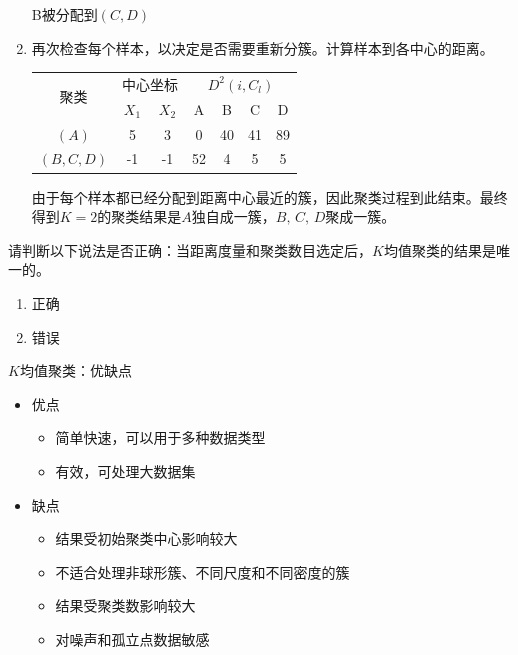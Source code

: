 \begin{example}
\begin{enumerate}
        B被分配到$(C,D)$
        \item 再次检查每个样本，以决定是否需要重新分簇。计算样本到各中心的距离。
        \begin{table}[htbp]
            \centering
            \begin{tabular}{|c|c|c|c|c|c|c|}
            \hline
            \multirow{2}[4]{*}{聚类} & \multicolumn{2}{c|}{中心坐标} & \multicolumn{4}{c|}{$D^2(i,C_l)$} \bigstrut\\
        \cline{2-7}        & $X_1$ & $X_2$ & A   & B   & C   & D \bigstrut\\
            \hline
            $(A)$ & 5   & 3   & 0   & 40  & 41  & 89 \bigstrut\\
            \hline
            $(B,C,D)$ & -1  & -1  & 52  & 4   & 5   & 5 \bigstrut\\
            \hline
            \end{tabular}%
        \end{table}%
        
        由于每个样本都已经分配到距离中心最近的簇，因此聚类过程到此结束。最终得到$K=2 $的聚类结果是$A $独自成一簇，$B,\,C,\,D $聚成一簇。
    \end{enumerate}
\end{example}
\begin{example}
    请判断以下说法是否正确：当距离度量和聚类数目选定后，$K $均值聚类的结果是唯一的。
    \begin{enumerate}[A]
        \item 正确
        \item \textcolor{main1}{错误}
    \end{enumerate}
\end{example}
\begin{note}
    $K $均值聚类：优缺点
    \begin{itemize}
        \item 优点
        \begin{itemize}
            \item 简单快速，可以用于多种数据类型
            \item 有效，可处理大数据集
        \end{itemize}
        \item 缺点
        \begin{itemize}
            \item 结果受初始聚类中心影响较大
            \item 不适合处理非球形簇、不同尺度和不同密度的簇
            \item 结果受聚类数影响较大
            \item 对噪声和孤立点数据敏感
        \end{itemize}
    \end{itemize}
\end{note}
